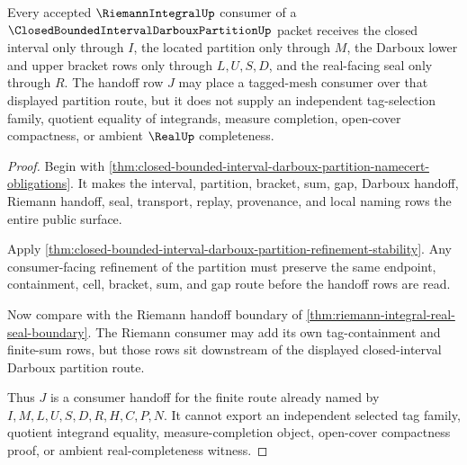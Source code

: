 \begin{theorem}
\label{thm:closed-bounded-interval-darboux-partition-riemann-handoff}
Every accepted $\RiemannIntegralUp$ consumer of a $\ClosedBoundedIntervalDarbouxPartitionUp$ packet receives the closed interval only through $I$, the located partition only through $M$, the Darboux lower and upper bracket rows only through $L,U,S,D$, and the real-facing seal only through $R$. The handoff row $J$ may place a tagged-mesh consumer over that displayed partition route, but it does not supply an independent tag-selection family, quotient equality of integrands, measure completion, open-cover compactness, or ambient $\RealUp$ completeness.
\end{theorem}
\begin{proof}
Begin with \autoref{thm:closed-bounded-interval-darboux-partition-namecert-obligations}. It makes the interval, partition, bracket, sum, gap, Darboux handoff, Riemann handoff, seal, transport, replay, provenance, and local naming rows the entire public surface.

Apply \autoref{thm:closed-bounded-interval-darboux-partition-refinement-stability}. Any consumer-facing refinement of the partition must preserve the same endpoint, containment, cell, bracket, sum, and gap route before the handoff rows are read.

Now compare with the Riemann handoff boundary of \autoref{thm:riemann-integral-real-seal-boundary}. The Riemann consumer may add its own tag-containment and finite-sum rows, but those rows sit downstream of the displayed closed-interval Darboux partition route.

Thus $J$ is a consumer handoff for the finite route already named by $I,M,L,U,S,D,R,H,C,P,N$. It cannot export an independent selected tag family, quotient integrand equality, measure-completion object, open-cover compactness proof, or ambient real-completeness witness.
\end{proof}


